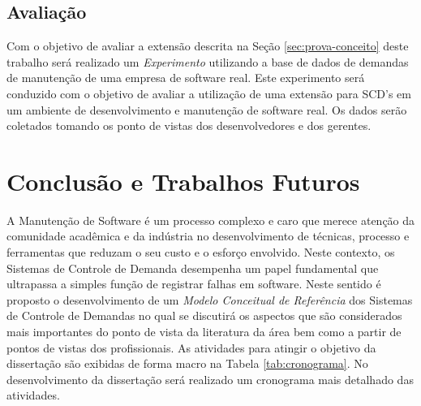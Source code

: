 \documentclass[msc,proposal,hidelot,hideabstract]{ppgccufmg} %
\begin{document}
\section{Avaliação}
\label{sec:avaliacao}

Com o objetivo de avaliar a extensão descrita na Seção \ref{sec:prova-conceito}
deste trabalho será realizado um \textit{Experimento}
\cite{wohlin2012experimentation} utilizando a base de dados de demandas de
manutenção de uma empresa de software real. Este experimento será conduzido com
o objetivo de avaliar a utilização de uma extensão para SCD's em um ambiente de
desenvolvimento e manutenção de software real. Os dados serão coletados tomando
os ponto de vistas dos desenvolvedores e dos gerentes.

\chapter{Conclusão e Trabalhos Futuros}
\label{ch:conclusao_trab_futuros}

A Manutenção de Software é um processo complexo e caro que merece atenção da
comunidade acadêmica e da indústria no desenvolvimento de técnicas, processo e
ferramentas que reduzam o seu custo e o esforço envolvido. Neste contexto, os
Sistemas de Controle de Demanda desempenha um papel fundamental que ultrapassa
a simples função de registrar falhas em software. Neste sentido é proposto o
desenvolvimento de um  \textit{Modelo Conceitual de Referência} dos Sistemas de
Controle de Demandas no qual se discutirá os aspectos que são considerados mais importantes do ponto de vista da literatura da área bem como
a partir de pontos de vistas dos profissionais. As atividades para
atingir o objetivo da dissertação são exibidas de forma macro na Tabela
\ref{tab:cronograma}. No desenvolvimento da dissertação será realizado um
cronograma mais detalhado das atividades.
\end{document}
